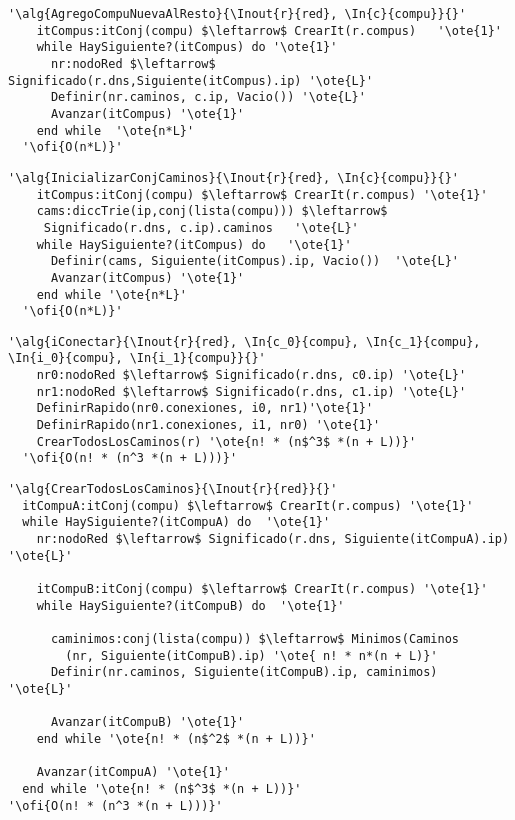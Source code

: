 \begin{lstlisting}[mathescape]
'\alg{AgregoCompuNuevaAlResto}{\Inout{r}{red}, \In{c}{compu}}{}'
    itCompus:itConj(compu) $\leftarrow$ CrearIt(r.compus)   '\ote{1}'
    while HaySiguiente?(itCompus) do '\ote{1}'
      nr:nodoRed $\leftarrow$ Significado(r.dns,Siguiente(itCompus).ip) '\ote{L}'
      Definir(nr.caminos, c.ip, Vacio()) '\ote{L}'
      Avanzar(itCompus) '\ote{1}'
    end while  '\ote{n*L}'
  '\ofi{O(n*L)}'
\end{lstlisting}

\begin{lstlisting}[mathescape]
'\alg{InicializarConjCaminos}{\Inout{r}{red}, \In{c}{compu}}{}'
    itCompus:itConj(compu) $\leftarrow$ CrearIt(r.compus) '\ote{1}'
    cams:diccTrie(ip,conj(lista(compu))) $\leftarrow$
     Significado(r.dns, c.ip).caminos   '\ote{L}'
    while HaySiguiente?(itCompus) do   '\ote{1}'
      Definir(cams, Siguiente(itCompus).ip, Vacio())  '\ote{L}'
      Avanzar(itCompus) '\ote{1}'
    end while '\ote{n*L}'
  '\ofi{O(n*L)}'
\end{lstlisting}

\begin{lstlisting}[mathescape]
'\alg{iConectar}{\Inout{r}{red}, \In{c_0}{compu}, \In{c_1}{compu}, \In{i_0}{compu}, \In{i_1}{compu}}{}'
    nr0:nodoRed $\leftarrow$ Significado(r.dns, c0.ip) '\ote{L}'
    nr1:nodoRed $\leftarrow$ Significado(r.dns, c1.ip) '\ote{L}'
    DefinirRapido(nr0.conexiones, i0, nr1)'\ote{1}'
    DefinirRapido(nr1.conexiones, i1, nr0) '\ote{1}'
    CrearTodosLosCaminos(r) '\ote{n! * (n$^3$ *(n + L))}'
  '\ofi{O(n! * (n^3 *(n + L)))}'
\end{lstlisting}

\begin{lstlisting}[mathescape]
'\alg{CrearTodosLosCaminos}{\Inout{r}{red}}{}'
  itCompuA:itConj(compu) $\leftarrow$ CrearIt(r.compus) '\ote{1}'
  while HaySiguiente?(itCompuA) do  '\ote{1}'
    nr:nodoRed $\leftarrow$ Significado(r.dns, Siguiente(itCompuA).ip) '\ote{L}'

    itCompuB:itConj(compu) $\leftarrow$ CrearIt(r.compus) '\ote{1}'
    while HaySiguiente?(itCompuB) do  '\ote{1}'

      caminimos:conj(lista(compu)) $\leftarrow$ Minimos(Caminos
        (nr, Siguiente(itCompuB).ip) '\ote{ n! * n*(n + L)}'
      Definir(nr.caminos, Siguiente(itCompuB).ip, caminimos)  '\ote{L}'

      Avanzar(itCompuB) '\ote{1}'
    end while '\ote{n! * (n$^2$ *(n + L))}'

    Avanzar(itCompuA) '\ote{1}'
  end while '\ote{n! * (n$^3$ *(n + L))}'
'\ofi{O(n! * (n^3 *(n + L)))}'
\end{lstlisting}

